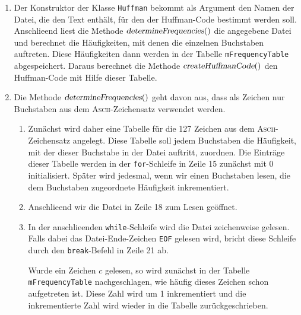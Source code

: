 \begin{enumerate}
\item Der Konstruktor der Klasse \texttt{Huffman} bekommt als Argument den Namen der Datei, die
      den Text enth\"alt, f\"ur den der Huffman-Code bestimmt werden soll.  Anschlie\3end liest
      die Methode $\textsl{determineFrequencies}()$  die angegebene Datei und berechnet die H\"aufigkeiten,
      mit denen die einzelnen Buchstaben auftreten.  Diese H\"aufigkeiten dann werden in der
      Tabelle \texttt{mFrequencyTable} abgespeichert.  Daraus berechnet die Methode
      $\textsl{createHuffmanCode}()$ den Huffman-Code mit Hilfe dieser Tabelle.
\item Die Methode $\textsl{determineFrequencies}()$ geht davon aus, dass als Zeichen nur
      Buchstaben aus dem \textsc{Ascii}-Zeichensatz verwendet werden.
      \begin{enumerate}
      \item Zun\"achst wird daher eine Tabelle f\"ur die 127 Zeichen aus dem
            \textsc{Ascii}-Zeichensatz angelegt.   Diese Tabelle soll jedem 
            Buchstaben die H\"aufigkeit, mit der dieser Buchstabe in der Datei auftritt,
            zuordnen.  Die Eintr\"age dieser Tabelle werden 
            in der \texttt{for}-Schleife in Zeile 15 zun\"achst mit 0 initialisiert.
            Sp\"ater wird jedesmal,  wenn wir einen Buchstaben lesen, die dem Buchstaben
            zugeordnete H\"aufigkeit inkrementiert.
      \item Anschlie\3end wir die Datei in Zeile 18 zum Lesen ge\"offnet.
      \item In der anschlie\3enden \texttt{while}-Schleife wird die Datei zeichenweise
            gelesen.  Falls dabei das Datei-Ende-Zeichen \texttt{EOF} gelesen wird,
            bricht diese Schleife durch den \texttt{break}-Befehl in Zeile 21 ab. 
            
            Wurde ein Zeichen $c$ gelesen, so wird zun\"achst in der Tabelle
            \texttt{mFrequencyTable} nachgeschlagen, wie h\"aufig dieses Zeichen schon
            aufgetreten ist.  Diese Zahl wird um 1 inkrementiert und die inkrementierte
            Zahl wird wieder in die Tabelle zur\"uckgeschrieben.
            

\end{enumerate}
\end{enumerate}
